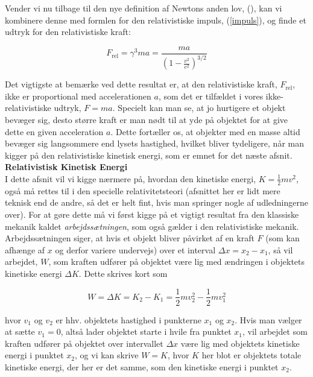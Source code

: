 Vender vi nu tilbage til den nye definition af Newtons anden lov, (), kan vi kombinere denne med formlen for den relativistiske impuls, (\ref{impuls}), og finde et udtryk for den relativistiske kraft:


\begin{equation}
F_{\text{rel}} = \gamma^3 m a =   \frac{ma}{ \left( 1 - \frac{v^2}{c^2} \right)^{3/2}}   
\label{kraft}
\end{equation}

\vspace{2mm}

Det vigtigste at bemærke ved dette resultat er, at den relativistiske kraft, $F_{\text{rel}}$, ikke er proportional med accelerationen $a$, som det er tilfældet i vores ikke-relativistiske udtryk, $F = ma$. Specielt kan man se, at jo hurtigere et objekt bevæger sig, desto større kraft er man nødt til at yde på objektet for at give dette en given acceleration $a$. Dette fortæller os, at objekter med en masse altid bevæger sig langsommere end lysets hastighed, hvilket bliver tydeligere, når man kigger på den relativistiske kinetisk energi, som er emnet for det næste afsnit.\\ 

\noindent
\textbf{Relativistisk Kinetisk Energi}\\


I dette afsnit vil vi kigge nærmere på, hvordan den kinetiske energi, $K = \frac{1}{2} m v^2$, også må rettes til i den specielle relativitetsteori (afsnittet her er lidt mere teknisk end de andre,  så det er helt fint, hvis man springer nogle af udledningerne over). For at gøre dette må vi først kigge på et vigtigt resultat fra den klassiske mekanik kaldet \emph{arbejdssætningen}, som også gælder i den relativistiske mekanik. Arbejdssætningen siger, at hvis et objekt bliver påvirket af en kraft $F$ (som kan afhænge af $x$ og derfor variere undervejs) over et interval $\Delta x = x_2 - x_1$, så vil arbejdet, $W$, som kraften udfører på objektet være lig med ændringen i objektets kinetiske energi $\Delta K$. Dette skrives kort som

\begin{equation}
W = \Delta K = K_2 - K_1 = \frac{1}{2}m v_2^2 - \frac{1}{2} m v_1^2
\label{arbejd}
\end{equation}

\vspace{2mm}

hvor $v_1$ og $v_2$ er hhv. objektets hastighed i punkterne $x_1$ og $x_2$. Hvis man vælger at sætte $v_1 = 0$, altså lader objektet starte i hvile fra punktet $x_1$, vil arbejdet som kraften udfører på objektet over intervallet $\Delta x$ være lig med objektets kinetiske energi i punktet $x_2$, og vi kan skrive $W = K$, hvor $K$ her blot er objektets totale kinetiske energi, der her er det samme, som den kinetiske energi i punktet $x_2$.\\

